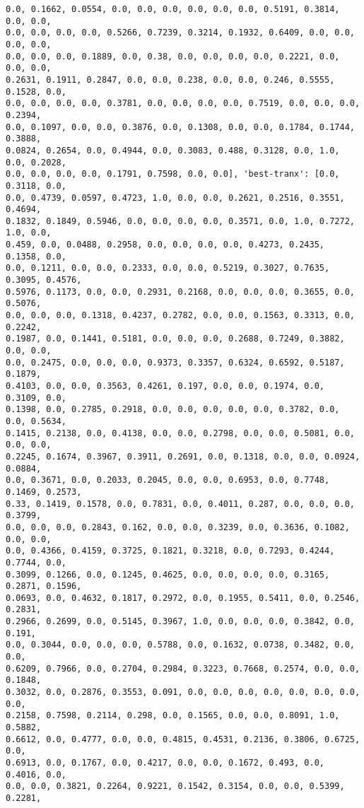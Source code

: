 \documentclass[11pt]{article}
\begin{document}
\begin{Verbatim}[commandchars=\\\{\}]
0.0, 0.1662, 0.0554, 0.0, 0.0, 0.0, 0.0, 0.0, 0.0, 0.5191, 0.3814, 0.0, 0.0,
0.0, 0.0, 0.0, 0.0, 0.5266, 0.7239, 0.3214, 0.1932, 0.6409, 0.0, 0.0, 0.0, 0.0,
0.0, 0.0, 0.0, 0.1889, 0.0, 0.38, 0.0, 0.0, 0.0, 0.0, 0.2221, 0.0, 0.0, 0.0,
0.2631, 0.1911, 0.2847, 0.0, 0.0, 0.238, 0.0, 0.0, 0.246, 0.5555, 0.1528, 0.0,
0.0, 0.0, 0.0, 0.0, 0.3781, 0.0, 0.0, 0.0, 0.0, 0.7519, 0.0, 0.0, 0.0, 0.2394,
0.0, 0.1097, 0.0, 0.0, 0.3876, 0.0, 0.1308, 0.0, 0.0, 0.1784, 0.1744, 0.3888,
0.0824, 0.2654, 0.0, 0.4944, 0.0, 0.3083, 0.488, 0.3128, 0.0, 1.0, 0.0, 0.2028,
0.0, 0.0, 0.0, 0.0, 0.1791, 0.7598, 0.0, 0.0], 'best-tranx': [0.0, 0.3118, 0.0,
0.0, 0.4739, 0.0597, 0.4723, 1.0, 0.0, 0.0, 0.2621, 0.2516, 0.3551, 0.4694,
0.1832, 0.1849, 0.5946, 0.0, 0.0, 0.0, 0.0, 0.3571, 0.0, 1.0, 0.7272, 1.0, 0.0,
0.459, 0.0, 0.0488, 0.2958, 0.0, 0.0, 0.0, 0.0, 0.4273, 0.2435, 0.1358, 0.0,
0.0, 0.1211, 0.0, 0.0, 0.2333, 0.0, 0.0, 0.5219, 0.3027, 0.7635, 0.3095, 0.4576,
0.5976, 0.1173, 0.0, 0.0, 0.2931, 0.2168, 0.0, 0.0, 0.0, 0.3655, 0.0, 0.5076,
0.0, 0.0, 0.0, 0.1318, 0.4237, 0.2782, 0.0, 0.0, 0.1563, 0.3313, 0.0, 0.2242,
0.1987, 0.0, 0.1441, 0.5181, 0.0, 0.0, 0.0, 0.2688, 0.7249, 0.3882, 0.0, 0.0,
0.0, 0.2475, 0.0, 0.0, 0.0, 0.9373, 0.3357, 0.6324, 0.6592, 0.5187, 0.1879,
0.4103, 0.0, 0.0, 0.3563, 0.4261, 0.197, 0.0, 0.0, 0.1974, 0.0, 0.3109, 0.0,
0.1398, 0.0, 0.2785, 0.2918, 0.0, 0.0, 0.0, 0.0, 0.0, 0.3782, 0.0, 0.0, 0.5634,
0.1415, 0.2138, 0.0, 0.4138, 0.0, 0.0, 0.2798, 0.0, 0.0, 0.5081, 0.0, 0.0, 0.0,
0.2245, 0.1674, 0.3967, 0.3911, 0.2691, 0.0, 0.1318, 0.0, 0.0, 0.0924, 0.0884,
0.0, 0.3671, 0.0, 0.2033, 0.2045, 0.0, 0.0, 0.6953, 0.0, 0.7748, 0.1469, 0.2573,
0.33, 0.1419, 0.1578, 0.0, 0.7831, 0.0, 0.4011, 0.287, 0.0, 0.0, 0.0, 0.3799,
0.0, 0.0, 0.0, 0.2843, 0.162, 0.0, 0.0, 0.3239, 0.0, 0.3636, 0.1082, 0.0, 0.0,
0.0, 0.4366, 0.4159, 0.3725, 0.1821, 0.3218, 0.0, 0.7293, 0.4244, 0.7744, 0.0,
0.3099, 0.1266, 0.0, 0.1245, 0.4625, 0.0, 0.0, 0.0, 0.0, 0.3165, 0.2871, 0.1596,
0.0693, 0.0, 0.4632, 0.1817, 0.2972, 0.0, 0.1955, 0.5411, 0.0, 0.2546, 0.2831,
0.2966, 0.2699, 0.0, 0.5145, 0.3967, 1.0, 0.0, 0.0, 0.0, 0.3842, 0.0, 0.191,
0.0, 0.3044, 0.0, 0.0, 0.0, 0.5788, 0.0, 0.1632, 0.0738, 0.3482, 0.0, 0.0,
0.6209, 0.7966, 0.0, 0.2704, 0.2984, 0.3223, 0.7668, 0.2574, 0.0, 0.0, 0.1848,
0.3032, 0.0, 0.2876, 0.3553, 0.091, 0.0, 0.0, 0.0, 0.0, 0.0, 0.0, 0.0, 0.0,
0.2158, 0.7598, 0.2114, 0.298, 0.0, 0.1565, 0.0, 0.0, 0.8091, 1.0, 0.5882,
0.6612, 0.0, 0.4777, 0.0, 0.0, 0.4815, 0.4531, 0.2136, 0.3806, 0.6725, 0.0,
0.6913, 0.0, 0.1767, 0.0, 0.4217, 0.0, 0.0, 0.1672, 0.493, 0.0, 0.4016, 0.0,
0.0, 0.0, 0.3821, 0.2264, 0.9221, 0.1542, 0.3154, 0.0, 0.0, 0.5399, 0.2281,

\end{Verbatim}
\end{document}

